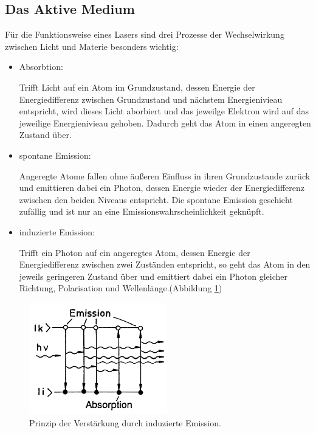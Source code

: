 \subsection{Das Aktive Medium}
Für die Funktionsweise eines Lasers sind drei Prozesse der Wechselwirkung zwischen Licht und Materie besonders wichtig:
\begin{itemize}
    \item Absorbtion:

    Trifft Licht auf ein Atom im Grundzustand, dessen Energie der Energiedifferenz zwischen Grundzustand und nächstem Energienivieau entspricht, wird dieses Licht aborbiert und das jeweilge Elektron wird auf das jeweilige Energienivieau gehoben. Dadurch geht das Atom in einen angeregten Zustand über.

    \item spontane Emission:

    Angeregte Atome fallen ohne äußeren Einfluss in ihren Grundzustande zurück und emittieren dabei ein Photon, dessen Energie wieder der Energiedifferenz zwischen den beiden Niveaus entspricht. Die spontane Emission geschieht zufällig und ist nur an eine Emissionswahrscheinlichkeit geknüpft. 

    \item induzierte Emission:

    Trifft ein Photon auf ein angeregtes Atom, dessen Energie der Energiedifferenz zwischen zwei Zuständen entspricht, so geht das Atom in den jeweils geringeren Zustand über und emittiert dabei ein Photon gleicher Richtung, Polarisation und Wellenlänge.(Abbildung \ref{fig:ver})
\end{itemize}

\begin{figure}
    \centering
    \includegraphics[width=6cm]{Bilder/verstaerkung.PNG}
    \caption{Prinzip der Verstärkung durch induzierte Emission.\cite{Laserspektroskopie_1}}
    \label{fig:ver}
\end{figure}

